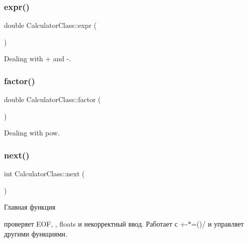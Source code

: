 \subsubsection{\texorpdfstring{expr()}{expr()}}
{\footnotesize\ttfamily double Calculator\+Class\+::expr (\begin{DoxyParamCaption}{ }\end{DoxyParamCaption})\hspace{0.3cm}{\ttfamily [private]}}



Dealing with + and -\/. 

\mbox{\label{class_calculator_class_a62e618b9d78a224ec8651b7bc1b63aaa}} 
\subsubsection{\texorpdfstring{factor()}{factor()}}
{\footnotesize\ttfamily double Calculator\+Class\+::factor (\begin{DoxyParamCaption}{ }\end{DoxyParamCaption})\hspace{0.3cm}{\ttfamily [private]}}



Dealing with pow. 

\mbox{\label{class_calculator_class_aaf44bb6d897096a70f657b66b6ae5b0e}} 
\subsubsection{\texorpdfstring{next()}{next()}}
{\footnotesize\ttfamily int Calculator\+Class\+::next (\begin{DoxyParamCaption}{ }\end{DoxyParamCaption})\hspace{0.3cm}{\ttfamily [private]}}



Главная функция 

проверяет E\+OF, \textquotesingle{} \textquotesingle{}, floats и некорректный ввод. Работает с +-\/$\ast$=()/ и управляет другими функциями. \mbox{\label{class_calculator_class_adf79d91e70a4c7218dadf3814e518ad5}} 
